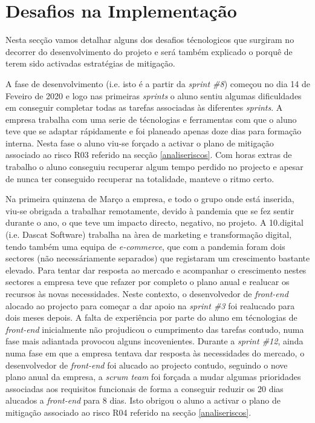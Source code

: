 \section{Desafios na Implementação}
\label{sec:dificuldades}

Nesta secção vamos detalhar alguns dos desafios técnologicos que surgiram no decorrer do desenvolvimento do projeto e será também explicado o porquê de terem sido activadas estratégias de mitigação.

A fase de desenvolvimento (i.e. isto é a partir da \textit{sprint \#8}) começou no dia 14 de Feveiro de 2020 e logo nas primeiras \textit{sprints} o aluno sentiu algumas dificuldades em conseguir completar todas as tarefas associadas às diferentes \textit{sprints}. A empresa trabalha com uma serie de técnologias e ferramentas com que o aluno teve que se adaptar rápidamente e foi planeado apenas doze dias para formação interna. Nesta fase o aluno viu-se forçado a activar o plano de mitigação associado ao risco R03 referido na secção \ref{analiseriscos}. Com horas extras de trabalho o aluno conseguiu recuperar algum tempo perdido no projecto e apesar de nunca ter conseguido recuperar na totalidade, manteve o ritmo certo.

Na primeira quinzena de Março a empresa, e todo o grupo onde está inserida, viu-se obrigada a trabalhar remotamente, devido à pandemia que se fez sentir durante o ano, o que teve um impacto directo, negativo, no projeto. A 10.digital (i.e. Dascat Software) trabalha na àrea de marketing e transformação digital, tendo também uma equipa de \textit{e-commerce}, que com a pandemia foram dois sectores (não necessáriamente separados) que registaram um crescimento bastante elevado. 
Para tentar dar resposta ao mercado e acompanhar o crescimento nestes sectores a empresa teve que refazer por completo o plano anual e realucar os recursos às novas necessidades. 
Neste contexto, o desenvolvedor de \textit{front-end} alocado ao projecto para começar a dar apoio na \textit{sprint \#3} foi realucado para dois meses depois. A falta de experiência por parte do aluno em técnologias de \textit{front-end} inicialmente não projudicou o cumprimento das tarefas contudo, numa fase mais adiantada provocou alguns incovenientes. 
Durante a \textit{sprint \#12}, ainda numa fase em que a empresa tentava dar resposta às necessidades do mercado, o desenvolvedor de \textit{front-end} foi alucado ao projecto contudo, seguindo o nove plano anual da empresa, a \textit{scrum team} foi forçada a mudar algumas prioridades associadas aos requisitos funcionais de forma a conseguir reduzir os 20 dias alucados a \textit{front-end} para 8 dias. Isto obrigou o aluno a activar o plano de mitigação associado ao risco R04 referido na secção \ref{analiseriscos}. 

